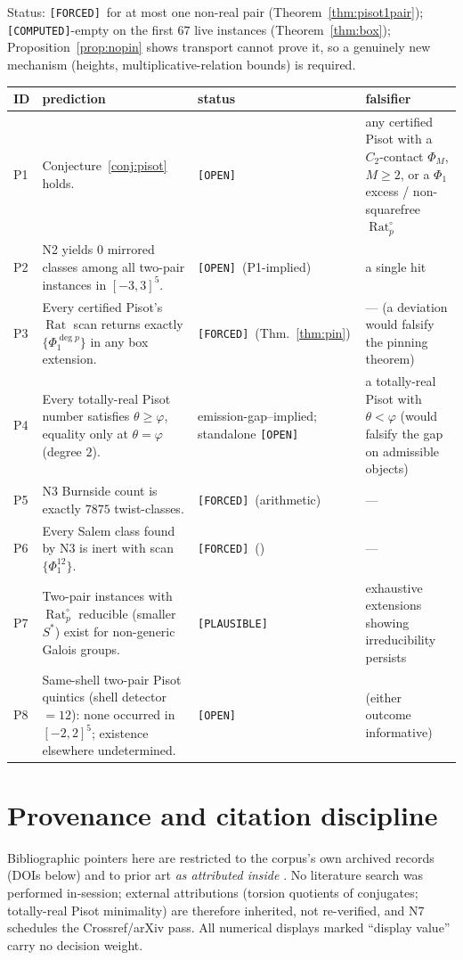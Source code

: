\documentclass[11pt]{article}
\newcommand{\F}{\textnormal{\texttt{[FORCED]}}}
\newcommand{\C}{\textnormal{\texttt{[COMPUTED]}}}
\newcommand{\Pl}{\textnormal{\texttt{[PLAUSIBLE]}}}
\newcommand{\Op}{\textnormal{\texttt{[OPEN]}}}
\newcommand{\Rat}{\operatorname{Rat}}
\theoremstyle{definition}
\begin{document}
Status: \F\ for at most one non-real pair (Theorem~\ref{thm:pisot1pair});
\C-empty on the first $67$ live instances (Theorem~\ref{thm:box});
Proposition~\ref{prop:nopin} shows transport cannot prove it, so a genuinely
new mechanism (heights, multiplicative-relation bounds) is required.

\begin{center}
\small
\begin{tabular}{p{0.6cm}p{8.2cm}p{2.4cm}p{3.6cm}}
\hline
ID & prediction & status & falsifier\\
\hline
P1 & Conjecture~\ref{conj:pisot} holds. & \Op & any certified Pisot with a
$C_2$-contact $\Phi_M$, $M\ge2$, or a $\Phi_1$ excess / non-squarefree
$\Rat_p^{\circ}$\\
P2 & N2 yields $0$ mirrored classes among all two-pair instances in
$[-3,3]^5$. & \Op\ (P1-implied) & a single hit\\
P3 & Every certified Pisot's $\Rat$ scan returns exactly $\{\Phi_1^{\deg p}\}$
in any box extension. & \F\ (Thm.~\ref{thm:pin}) & --- (a deviation would
falsify the pinning theorem)\\
P4 & Every totally-real Pisot number satisfies $\theta\ge\varphi$, equality
only at $\theta=\varphi$ (degree $2$). & emission-gap--implied; standalone
\Op & a totally-real Pisot with $\theta<\varphi$ (would falsify the gap on
admissible objects)\\
P5 & N3 Burnside count is exactly $7875$ twist-classes. & \F\ (arithmetic) & ---\\
P6 & Every Salem class found by N3 is inert with scan $\{\Phi_1^{12}\}$.
& \F\ (\cite[Cor.~7.14]{relcharge}) & ---\\
P7 & Two-pair instances with $\Rat_p^{\circ}$ reducible (smaller $S^{*}$)
exist for non-generic Galois groups. & \Pl & exhaustive extensions showing
irreducibility persists\\
P8 & Same-shell two-pair Pisot quintics (shell detector $=12$): none occurred
in $[-2,2]^5$; existence elsewhere undetermined. & \Op & (either outcome
informative)\\
\hline
\end{tabular}
\end{center}

\section{Provenance and citation discipline}\label{sec:provenance}

Bibliographic pointers here are restricted to the corpus's own archived records
(DOIs below) and to prior art \emph{as attributed inside}
\cite[Rem.~7.20 and refs.~14--16]{relcharge}. No literature search was performed
in-session; external attributions (torsion quotients of conjugates; totally-real
Pisot minimality) are therefore inherited, not re-verified, and N7 schedules the
Crossref/arXiv pass. All numerical displays marked ``display value'' carry no
decision weight.
\end{document}
